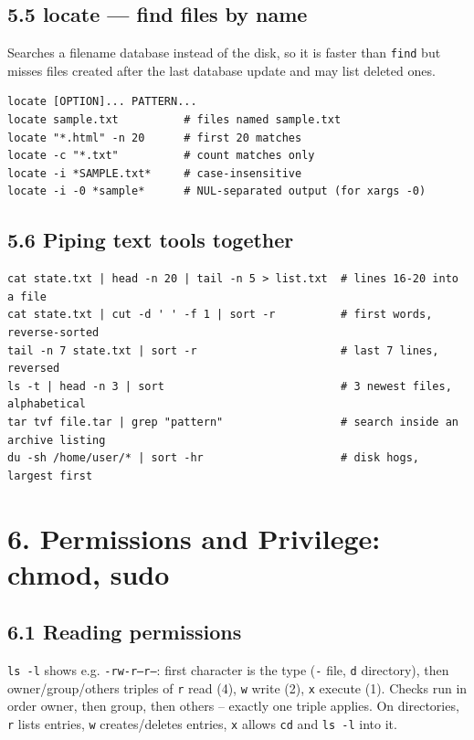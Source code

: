 \documentclass[11pt,a4paper]{article}
\newcommand{\cmd}[1]{\texttt{#1}}
\begin{document}
\subsection{5.5 locate --- find files by name}
Searches a filename database instead of the disk, so it is faster than \cmd{find} but misses files created after the last database update and may list deleted ones.
\begin{lstlisting}
locate [OPTION]... PATTERN...
locate sample.txt          # files named sample.txt
locate "*.html" -n 20      # first 20 matches
locate -c "*.txt"          # count matches only
locate -i *SAMPLE.txt*     # case-insensitive
locate -i -0 *sample*      # NUL-separated output (for xargs -0)
\end{lstlisting}

\subsection{5.6 Piping text tools together}
\begin{lstlisting}
cat state.txt | head -n 20 | tail -n 5 > list.txt  # lines 16-20 into a file
cat state.txt | cut -d ' ' -f 1 | sort -r          # first words, reverse-sorted
tail -n 7 state.txt | sort -r                      # last 7 lines, reversed
ls -t | head -n 3 | sort                           # 3 newest files, alphabetical
tar tvf file.tar | grep "pattern"                  # search inside an archive listing
du -sh /home/user/* | sort -hr                     # disk hogs, largest first
\end{lstlisting}

\section{6. Permissions and Privilege: chmod, sudo}

\subsection{6.1 Reading permissions}
\cmd{ls -l} shows e.g. \cmd{-rw-r--r--}: first character is the type (\cmd{-} file, \cmd{d} directory), then owner/group/others triples of \cmd{r} read (4), \cmd{w} write (2), \cmd{x} execute (1). Checks run in order owner, then group, then others -- exactly one triple applies. On directories, \cmd{r} lists entries, \cmd{w} creates/deletes entries, \cmd{x} allows \cmd{cd} and \cmd{ls -l} into it.
\end{document}
